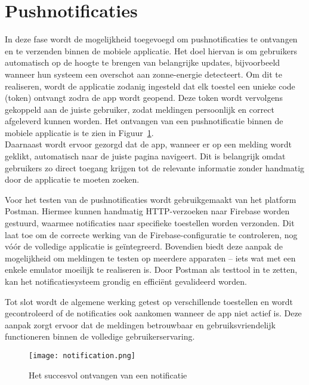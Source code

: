 \section{Pushnotificaties}

In deze fase wordt de mogelijkheid toegevoegd om pushnotificaties te ontvangen en te verzenden binnen de mobiele applicatie. Het doel hiervan is om gebruikers automatisch op de hoogte te brengen van belangrijke updates, bijvoorbeeld wanneer hun systeem een overschot aan zonne-energie detecteert. Om dit te realiseren, wordt de applicatie zodanig ingesteld dat elk toestel een unieke code (token) ontvangt zodra de app wordt geopend. Deze token wordt vervolgens gekoppeld aan de juiste gebruiker, zodat meldingen persoonlijk en correct afgeleverd kunnen worden. Het ontvangen van een pushnotificatie binnen de mobiele applicatie is te zien in Figuur~\ref{fig:notification}.\\

Daarnaast wordt ervoor gezorgd dat de app, wanneer er op een melding wordt geklikt, automatisch naar de juiste pagina navigeert. Dit is belangrijk omdat gebruikers zo direct toegang krijgen tot de relevante informatie zonder handmatig door de applicatie te moeten zoeken.

Voor het testen van de pushnotificaties wordt gebruikgemaakt van het platform Postman. Hiermee kunnen handmatig HTTP-verzoeken naar Firebase worden gestuurd, waarmee notificaties naar specifieke toestellen worden verzonden. Dit laat toe om de correcte werking van de Firebase-configuratie te controleren, nog vóór de volledige applicatie is geïntegreerd. Bovendien biedt deze aanpak de mogelijkheid om meldingen te testen op meerdere apparaten – iets wat met een enkele emulator moeilijk te realiseren is. Door Postman als testtool in te zetten, kan het notificatiesysteem grondig en efficiënt gevalideerd worden.

Tot slot wordt de algemene werking getest op verschillende toestellen en wordt gecontroleerd of de notificaties ook aankomen wanneer de app niet actief is. Deze aanpak zorgt ervoor dat de meldingen betrouwbaar en gebruiksvriendelijk functioneren binnen de volledige gebruikerservaring. \\

\begin{figure}[H]
    \centering
    \texttt{[image: notification.png]}
    \caption{Het succesvol ontvangen van een notificatie}
    \label{fig:notification}
\end{figure}

